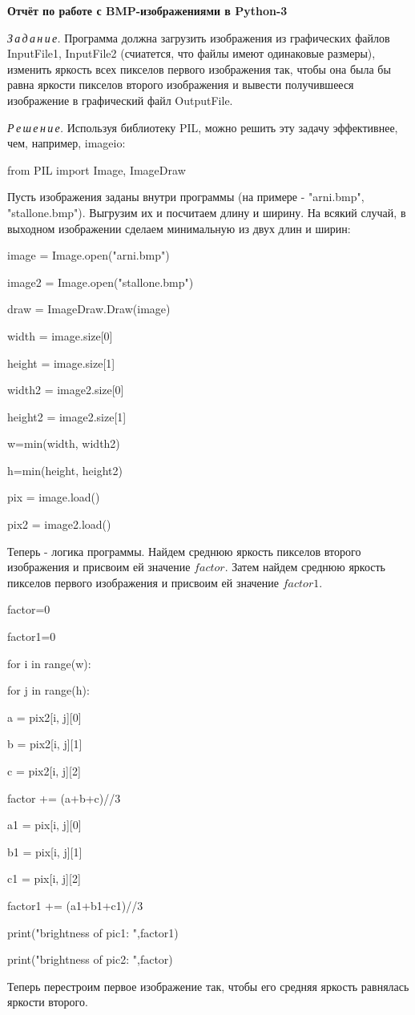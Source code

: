 \documentclass{article}
\newcommand\tab[1][1cm]{\hspace*{#1}}
\begin{document}
\begin{center}


{\large\bf Отчёт по работе с BMP-изображениями в Python-3}
\end{center}
\textit{З\,а\,д\,а\,н\,и\,е.}  Программа должна загрузить изображения из графических файлов InputFile1, InputFile2 (счиатется, что файлы имеют одинаковые размеры), изменить яркость всех пикселов первого изображения так, чтобы она была бы равна яркости пикселов второго изображения и вывести получившееся изображение в графический файл  OutputFile.
 
\textit{Р\,е\,ш\,е\,н\,и\,е.}  Используя библиотеку PIL, можно решить эту задачу эффективнее, чем, например, imageio:

\textsf{from PIL import Image, ImageDraw }

Пусть изображения заданы внутри программы (на примере - "arni.bmp", "stallone.bmp"). Выгрузим их и посчитаем длину и ширину. На всякий случай, в выходном изображении сделаем минимальную из двух длин и ширин:

{

image = Image.open("arni.bmp")
 
image2 =  Image.open("stallone.bmp") 

draw = ImageDraw.Draw(image) 

width = image.size[0]  

height = image.size[1]  

width2 = image2.size[0]  

height2 = image2.size[1]  

w=min(width, width2)

h=min(height, height2)	

pix = image.load() 

pix2 = image2.load() }


 Теперь - логика программы. Найдем среднюю яркость пикселов второго изображения и присвоим ей значение $factor $. Затем найдем среднюю яркость пикселов первого изображения и присвоим ей значение $factor1 $.
 
{

factor=0

factor1=0

for i in range(w):

\tab[1cm] for j in range(h):

\tab[2cm]		a = pix2[i, j][0] 

\tab[2cm]		b = pix2[i, j][1] 

\tab[2cm]		c = pix2[i, j][2]

\tab[2cm]		factor += (a+b+c)//3

\tab[2cm]		a1 = pix[i, j][0]  

\tab[2cm]		b1 = pix[i, j][1] 

\tab[2cm]		c1 = pix[i, j][2] 

\tab[2cm]		factor1 += (a1+b1+c1)//3

print("brightness of pic1: ",factor1)

print("brightness of pic2: ",factor) }
\newpage
Теперь перестроим первое изображение так, чтобы его средняя яркость равнялась яркости второго. 
\end{document}
